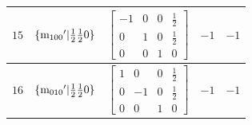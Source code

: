 \documentclass[fleqn,8pt]{jsarticle}
\begin{document}
\begin{longtable}{ccccc}
$ 15 $ & $ \{{\rm m}_{100}{}'|\frac{1}{2} \frac{1}{2} 0\} $ & $ \begin{bmatrix} -1 & 0 & 0 & \frac{1}{2} \\ 0 & 1 & 0 & \frac{1}{2} \\ 0 & 0 & 1 & 0 \end{bmatrix} $ & $ -1 $ & $ -1 $ \\ \hline
$ 16 $ & $ \{{\rm m}_{010}{}'|\frac{1}{2} \frac{1}{2} 0\} $ & $ \begin{bmatrix} 1 & 0 & 0 & \frac{1}{2} \\ 0 & -1 & 0 & \frac{1}{2} \\ 0 & 0 & 1 & 0 \end{bmatrix} $ & $ -1 $ & $ -1 $ \\
\end{longtable}
\end{document}
